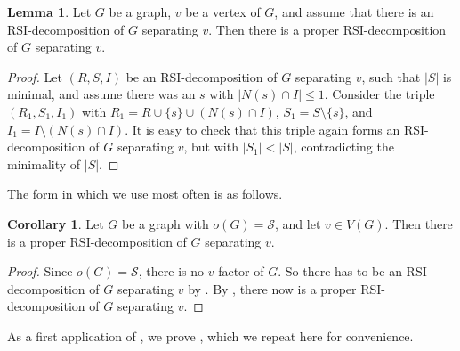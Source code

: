 \documentclass[a4paper,11pt,oneside]{scrartcl}
\theoremstyle{definition}
\newtheorem{lemma}[definition]{Lemma}
\newtheorem{corollary}[definition]{Corollary}
\theoremstyle{remark}
\begin{document}
\begin{lemma}\label{lemma:existence_of_proper_RSI}
    Let $G$ be a graph, $v$ be a vertex of $G$, and assume that there is an RSI-decomposition of $G$ separating $v$. Then there is a proper RSI-decomposition of $G$ separating $v$.
\end{lemma}
\begin{proof}
    Let $(R,S,I)$ be an RSI-decomposition of $G$ separating $v$, such that $|S|$ is minimal, and assume there was an $s$ with $|N(s) \cap I| \leq 1$. 
    Consider the triple $(R_1,S_1,I_1)$ with $R_1 = R \cup \{s\} \cup (N(s)\cap I)$, $S_1 = S \setminus \{s\}$, and $I_1 = I \setminus (N(s)\cap I)$. 
    It is easy to check that this triple again forms an RSI-decomposition of $G$ separating $v$, but with $|S_1| < |S|$, contradicting the minimality of $|S|$. 
\end{proof}

The form in which we use  most often is as follows.

\begin{corollary}\label{corollary:Staller_wins_then_proper_RSI-decomp}
    Let $G$ be a graph with $o(G) = \mathcal S$, and let $v \in V(G)$. Then there is a proper RSI-decomposition of $G$ separating $v$.
\end{corollary}
\begin{proof}
    Since $o(G) = \mathcal S$, there is no $v$-factor of $G$. So there has to be an RSI-decomposition of $G$ separating $v$ by . By , there now is a proper RSI-decomposition of $G$ separating $v$.
\end{proof}

As a first application of , we prove , which we repeat here for convenience.
\end{document}
